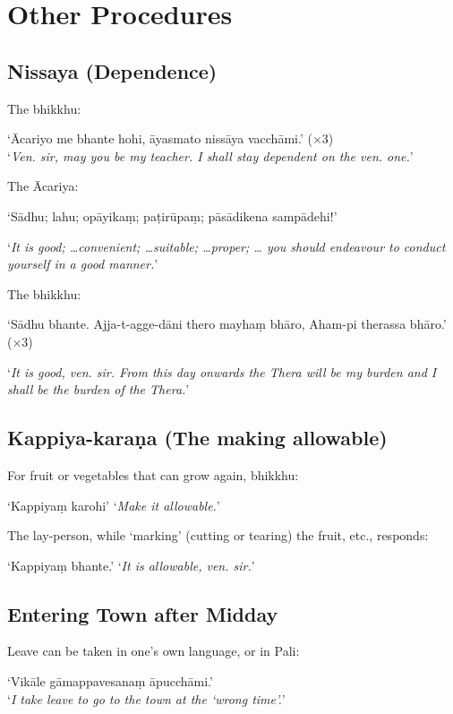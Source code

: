\chapter{Other Procedures}

\section{Nissaya (Dependence)}

The bhikkhu:

‘Ācariyo me bhante hohi, āyasmato nissāya vacchāmi.’ (×3)\\
‘\emph{Ven. sir, may you be my teacher. I shall stay dependent on the ven. one.}’

The Ācariya:

‘Sādhu; lahu; opāyikaṃ; paṭirūpaṃ; pāsādikena sampādehi!’

‘\emph{It is good; …convenient; …suitable; …proper; … you should endeavour to
  conduct yourself in a good manner.}’


The bhikkhu:

‘Sādhu bhante. Ajja-t-agge-dāni thero mayhaṃ bhāro, Aham-pi therassa bhāro.’ (×3)

‘\emph{It is good, ven. sir. From this day onwards the Thera will be my burden and I
shall be the burden of the Thera.}’


\section{Kappiya-karaṇa (The making allowable)}

For fruit or vegetables that can grow again, bhikkhu:

‘Kappiyaṃ karohi’ ‘\emph{Make it allowable.}’

The lay-person, while ‘marking’ (cutting or tearing) the fruit, etc., responds:

‘Kappiyaṃ bhante.’ ‘\emph{It is allowable, ven. sir.}’ 

\section{Entering Town after Midday}

Leave can be taken in one's own language, or in Pali:

‘Vikāle gāmappavesanaṃ āpucchāmi.’\\
‘\emph{I take leave to go to the town at the ‘wrong time’.}’ 

